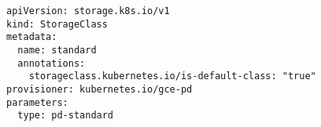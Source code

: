 \begin{verbatim}
apiVersion: storage.k8s.io/v1
kind: StorageClass
metadata:
  name: standard
  annotations:
    storageclass.kubernetes.io/is-default-class: "true"
provisioner: kubernetes.io/gce-pd
parameters:
  type: pd-standard
\end{verbatim}